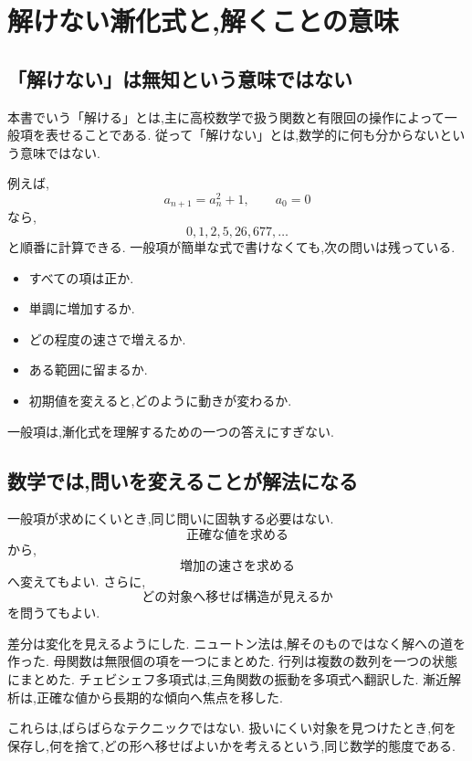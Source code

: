 
\section{解けない漸化式と,解くことの意味}

\subsection{「解けない」は無知という意味ではない}

本書でいう「解ける」とは,主に高校数学で扱う関数と有限回の操作によって一般項を表せることである.
従って「解けない」とは,数学的に何も分からないという意味ではない.

例えば,
\[
  a_{n+1}=a_n^2+1,\qquad a_0=0
\]
なら,
\[
  0,1,2,5,26,677,\ldots
\]
と順番に計算できる.
一般項が簡単な式で書けなくても,次の問いは残っている.

\begin{itemize}
  \item すべての項は正か.
  \item 単調に増加するか.
  \item どの程度の速さで増えるか.
  \item ある範囲に留まるか.
  \item 初期値を変えると,どのように動きが変わるか.
\end{itemize}

一般項は,漸化式を理解するための一つの答えにすぎない.

\subsection{数学では,問いを変えることが解法になる}

一般項が求めにくいとき,同じ問いに固執する必要はない.
\[
  \text{正確な値を求める}
\]
から,
\[
  \text{増加の速さを求める}
\]
へ変えてもよい.
さらに,
\[
  \text{どの対象へ移せば構造が見えるか}
\]
を問うてもよい.

差分は変化を見えるようにした.
ニュートン法は,解そのものではなく解への道を作った.
母関数は無限個の項を一つにまとめた.
行列は複数の数列を一つの状態にまとめた.
チェビシェフ多項式は,三角関数の振動を多項式へ翻訳した.
漸近解析は,正確な値から長期的な傾向へ焦点を移した.

これらは,ばらばらなテクニックではない.
扱いにくい対象を見つけたとき,何を保存し,何を捨て,どの形へ移せばよいかを考えるという,同じ数学的態度である.
